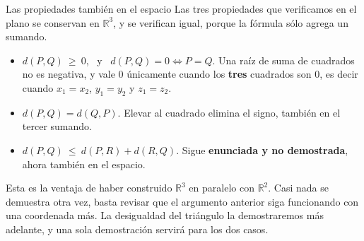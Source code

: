 \documentclass[aspectratio=169,10pt]{beamer}
\newcommand{\destaca}[1]{%
  \par\vspace{3pt}\noindent
  \colorbox{turquesaClaro}{%
    \parbox{\dimexpr\linewidth-2\fboxsep\relax}{\vspace{3pt}#1\vspace{3pt}}}%
  \par\vspace{3pt}}
\begin{document}
\begin{frame}{Las propiedades también en el espacio}
  Las tres propiedades que verificamos en el plano se conservan en
  $\mathbb{R}^3$, y se verifican igual, porque la fórmula sólo agrega
  un sumando.

  \vspace{0.25cm}
  \begin{itemize}
    \item[1.] $d(P,Q)\ \ge\ 0$, \ y \ $d(P,Q)=0 \iff P=Q$. Una raíz de
      suma de cuadrados no es negativa, y vale $0$ únicamente cuando
      los \textbf{tres} cuadrados son $0$, es decir cuando $x_1=x_2$,
      $y_1=y_2$ y $z_1=z_2$.
    \item[2.] $d(P,Q)=d(Q,P)$. Elevar al cuadrado elimina el signo,
      también en el tercer sumando.
    \item[3.] $d(P,Q)\ \le\ d(P,R)+d(R,Q)$. Sigue \textbf{enunciada y
      no demostrada}, ahora también en el espacio.
  \end{itemize}

  \vspace{0.35cm}
  \destaca{Esta es la ventaja de haber construido $\mathbb{R}^3$ en
  paralelo con $\mathbb{R}^2$. Casi nada se demuestra otra vez, basta
  revisar que el argumento anterior siga funcionando con una
  coordenada más. La desigualdad del triángulo la demostraremos más adelante, y una sola demostración servirá para los dos casos.}
\end{frame}
\end{document}
